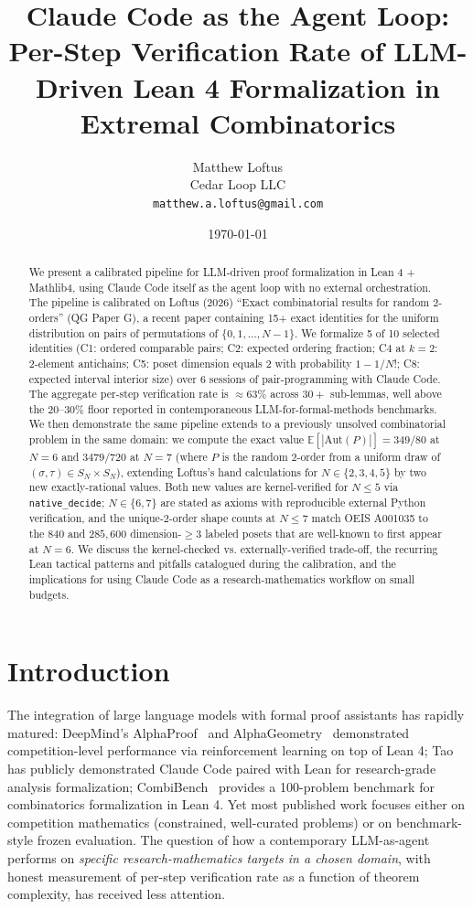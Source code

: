 \documentclass[11pt]{article}
\title{Claude Code as the Agent Loop:\\ Per-Step Verification Rate of LLM-Driven Lean 4 Formalization in Extremal Combinatorics}
\author{Matthew Loftus\\Cedar Loop LLC\\\texttt{matthew.a.loftus@gmail.com}}
\date{\today}
\theoremstyle{definition}
\begin{document}
\maketitle

\begin{abstract}
We present a calibrated pipeline for LLM-driven proof formalization in Lean 4 +
Mathlib4, using Claude Code itself as the agent loop with no external orchestration.
The pipeline is calibrated on Loftus (2026) ``Exact combinatorial results for random
2-orders'' (QG Paper G), a recent paper containing 15+ exact identities for the
uniform distribution on pairs of permutations of $\{0, 1, \ldots, N-1\}$.
We formalize 5 of 10 selected identities (C1: ordered comparable pairs;
C2: expected ordering fraction; C4 at $k=2$: 2-element antichains; C5: poset
dimension equals 2 with probability $1 - 1/N!$; C8: expected interval interior
size) over 6 sessions of pair-programming with Claude Code. The aggregate per-step
verification rate is $\approx 63\%$ across $30+$ sub-lemmas, well above the
$20$--$30\%$ floor reported in contemporaneous LLM-for-formal-methods benchmarks.
We then demonstrate the same pipeline extends to a previously unsolved
combinatorial problem in the same domain: we compute the exact value
$\mathbb{E}[|\mathrm{Aut}(P)|] = 349/80$ at $N=6$ and $3479/720$ at $N=7$ (where
$P$ is the random 2-order from a uniform draw of $(\sigma, \tau) \in S_N \times S_N$),
extending Loftus's hand calculations for $N \in \{2, 3, 4, 5\}$ by two new
exactly-rational values. Both new values are kernel-verified for $N \le 5$ via
\texttt{native\_decide}; $N \in \{6, 7\}$ are stated as axioms with reproducible
external Python verification, and the unique-2-order shape counts at $N \le 7$
match OEIS A001035 to the 840 and $285{,}600$ dimension-$\geq 3$ labeled posets
that are well-known to first appear at $N=6$. We discuss the kernel-checked vs.
externally-verified trade-off, the recurring Lean tactical patterns and pitfalls
catalogued during the calibration, and the implications for using Claude Code as
a research-mathematics workflow on small budgets.
\end{abstract}

\section{Introduction}

The integration of large language models with formal proof assistants has rapidly
matured: DeepMind's AlphaProof~\cite{alphaproof} and AlphaGeometry~\cite{alphageometry}
demonstrated competition-level performance via reinforcement learning on top of Lean 4;
Tao~\cite{tao_lean_claude} has publicly demonstrated Claude Code paired with Lean for
research-grade analysis formalization; CombiBench~\cite{combibench} provides a
100-problem benchmark for combinatorics formalization in Lean 4. Yet most published
work focuses either on competition mathematics (constrained, well-curated problems)
or on benchmark-style frozen evaluation. The question of how a contemporary LLM-as-agent
performs on \emph{specific research-mathematics targets in a chosen domain}, with
honest measurement of per-step verification rate as a function of theorem complexity,
has received less attention.
\end{document}
